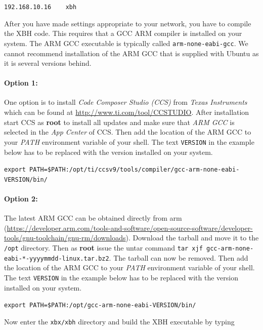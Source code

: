 \documentclass[twoside,11pt]{cergdoc}
\begin{document}
\begin{center}
\verb|192.168.10.16    xbh|
\end{center}

After you have made settings appropriate to your network, you have to compile
the XBH code. This requires that a GCC ARM compiler is installed on your system.
The ARM GCC executable is typically called \texttt{arm-none-eabi-gcc}. We cannot 
recommend installation of the ARM GCC that is supplied with Ubuntu as it is several 
versions behind.

\paragraph{Option 1:}
One option is to install \emph{Code Composer Studio (CCS)} from \emph{Texas Instruments}
which can be found at \url{http://www.ti.com/tool/CCSTUDIO}. After installation
start CCS as \textbf{root} to install all updates and make sure that 
\emph{ARM GCC} is selected in the \emph{App Center} of CCS. Then add the location
of the ARM GCC to your \emph{PATH} environment variable of your shell. The text 
\texttt{VERSION} in the example below has to be replaced with the version installed
on your system. 

\begin{center}
\lstinline|export PATH=$PATH:/opt/ti/ccsv9/tools/compiler/gcc-arm-none-eabi-VERSION/bin/| 
\end{center}

\paragraph{Option 2:}
The latest ARM GCC can be obtained directly from arm (\url{https://developer.arm.com/tools-and-software/open-source-software/developer-tools/gnu-toolchain/gnu-rm/downloads}). Download the tarball and move it to 
the \verb|/opt| directory. Then as \textbf{root} issue the untar command
\verb|tar xjf gcc-arm-none-eabi-*-yyyymmdd-linux.tar.bz2|. The tarball can now be 
removed.  Then add the location
of the ARM GCC to your \emph{PATH} environment variable of your shell. The text 
\texttt{VERSION} in the example below has to be replaced with the version installed
on your system. 

\begin{center}
\lstinline|export PATH=$PATH:/opt/gcc-arm-none-eabi-VERSION/bin/| 
\end{center}

Now enter the \verb|xbx/xbh| directory and build the XBH executable by typing 
\end{document}
